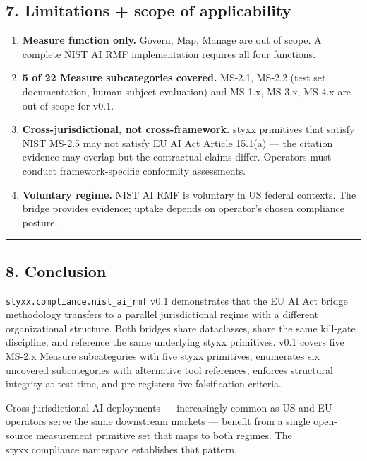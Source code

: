 \documentclass[
]{article}
\providecommand{\tightlist}{%
  \setlength{\itemsep}{0pt}\setlength{\parskip}{0pt}}
\begin{document}
\subsection{7. Limitations + scope of
applicability}\label{limitations-scope-of-applicability}

\begin{enumerate}
\def\labelenumi{\arabic{enumi}.}
\tightlist
\item
  \textbf{Measure function only.} Govern, Map, Manage are out of scope.
  A complete NIST AI RMF implementation requires all four functions.
\item
  \textbf{5 of 22 Measure subcategories covered.} MS-2.1, MS-2.2 (test
  set documentation, human-subject evaluation) and MS-1.x, MS-3.x,
  MS-4.x are out of scope for v0.1.
\item
  \textbf{Cross-jurisdictional, not cross-framework.} styxx primitives
  that satisfy NIST MS-2.5 may not satisfy EU AI Act Article 15.1(a) ---
  the citation evidence may overlap but the contractual claims differ.
  Operators must conduct framework-specific conformity assessments.
\item
  \textbf{Voluntary regime.} NIST AI RMF is voluntary in US federal
  contexts. The bridge provides evidence; uptake depends on operator's
  chosen compliance posture.
\end{enumerate}

\begin{center}\rule{0.5\linewidth}{0.5pt}\end{center}

\subsection{8. Conclusion}\label{conclusion}

\texttt{styxx.compliance.nist\_ai\_rmf} v0.1 demonstrates that the EU AI
Act bridge methodology transfers to a parallel jurisdictional regime
with a different organizational structure. Both bridges share
dataclasses, share the same kill-gate discipline, and reference the same
underlying styxx primitives. v0.1 covers five MS-2.x Measure
subcategories with five styxx primitives, enumerates six uncovered
subcategories with alternative tool references, enforces structural
integrity at test time, and pre-registers five falsification criteria.

Cross-jurisdictional AI deployments --- increasingly common as US and EU
operators serve the same downstream markets --- benefit from a single
open-source measurement primitive set that maps to both regimes. The
styxx.compliance namespace establishes that pattern.
\end{document}
